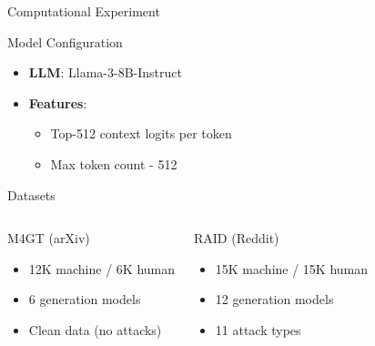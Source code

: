 \documentclass{beamer}
\begin{document}
\begin{frame}{Computational Experiment}
\begin{block}{Model Configuration}
\begin{itemize}
\item \textbf{LLM}: Llama-3-8B-Instruct
\item \textbf{Features}: 
  \begin{itemize}
  \item Top-512 context logits per token
  \item Max token count - 512
  \end{itemize}
\end{itemize}
\end{block}

\begin{block}{Datasets}
\begin{columns}[T]
\begin{block}{\small M4GT (arXiv)}
\begin{itemize}
\item 12K machine / 6K human
\item 6 generation models
\item Clean data (no attacks)
\end{itemize}
\end{block}

\begin{block}{\small RAID (Reddit)}
\begin{itemize}
\item 15K machine / 15K human
\item 12 generation models
\item 11 attack types
\end{itemize}
\end{block}
\end{columns}
\end{block}

\end{frame}
\end{document}
